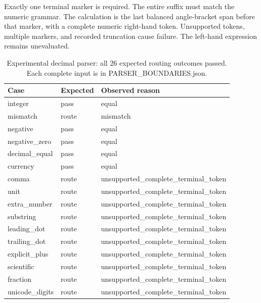 \documentclass[journal,onecolumn]{IEEEtran}
\begin{document}
Exactly one terminal marker is required. The entire suffix must match the numeric grammar. The calculation is the last balanced angle-bracket span before that marker, with a complete numeric right-hand token. Unsupported tokens, multiple markers, and recorded truncation cause failure. The left-hand expression remains unevaluated.
\begin{table}[H]
\centering
\caption{Experimental decimal parser: all 26 expected routing outcomes passed. Each complete input is in PARSER\_BOUNDARIES.json.}\label{tab:parser}
\footnotesize
\setlength{\tabcolsep}{4pt}
\begin{tabular}{@{}lll@{}}
\toprule
Case & Expected & Observed reason\\
\midrule
integer & pass & equal\\
mismatch & route & mismatch\\
negative & pass & equal\\
negative\_\allowbreak zero & pass & equal\\
decimal\_\allowbreak equal & pass & equal\\
currency & pass & equal\\
comma & route & unsupported\_\allowbreak complete\_\allowbreak terminal\_\allowbreak token\\
unit & route & unsupported\_\allowbreak complete\_\allowbreak terminal\_\allowbreak token\\
extra\_\allowbreak number & route & unsupported\_\allowbreak complete\_\allowbreak terminal\_\allowbreak token\\
substring & route & unsupported\_\allowbreak complete\_\allowbreak terminal\_\allowbreak token\\
leading\_\allowbreak dot & route & unsupported\_\allowbreak complete\_\allowbreak terminal\_\allowbreak token\\
trailing\_\allowbreak dot & route & unsupported\_\allowbreak complete\_\allowbreak terminal\_\allowbreak token\\
explicit\_\allowbreak plus & route & unsupported\_\allowbreak complete\_\allowbreak terminal\_\allowbreak token\\
scientific & route & unsupported\_\allowbreak complete\_\allowbreak terminal\_\allowbreak token\\
fraction & route & unsupported\_\allowbreak complete\_\allowbreak terminal\_\allowbreak token\\
unicode\_\allowbreak digits & route & unsupported\_\allowbreak complete\_\allowbreak terminal\_\allowbreak token\\

\end{tabular}
\end{table}
\end{document}
